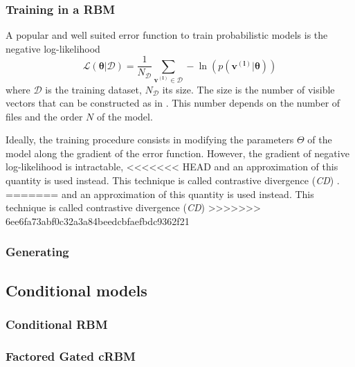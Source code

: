 \documentclass{article}
\begin{document}
\subsubsection{Training in a RBM}
A popular and well suited error function to train probabilistic models is the negative log-likelihood 
\begin{equation}
\label{eq:likelihood}
\mathcal{L(\bm{\theta}|\mathcal{D})}  = \frac{1}{N_{\mathcal{D}}} \sum_{\bm{v^{(l)}} \in \mathcal{D}} - \ln \left( p(\bm{v^{(l)}}|\bm{\theta})\right)
\end{equation}
where $\mathcal{D}$ is the training dataset, $N_{\mathcal{D}}$ its size. The size is the number of visible vectors that can be constructed as in . This number depends on the number of files and the order $N$ of the model.

Ideally, the training procedure consists in modifying the parameters $\Theta$ of the model along the gradient of the error function.
However, the gradient of negative log-likelihood is intractable,
<<<<<<< HEAD
and an approximation of this quantity is used instead. This technique is called contrastive divergence (\textit{CD}) \cite{fischer2012introduction,hinton2010practical}.
=======
and an approximation of this quantity is used instead. This technique is called contrastive divergence (\textit{CD}) 
>>>>>>> 6ee6fa73abf0c32a3a84beedcbfaefbdc9362f21
\subsubsection{Generating}

\subsection{Conditional models}
\subsubsection{Conditional RBM}
\subsubsection{Factored Gated cRBM}
\end{document}
